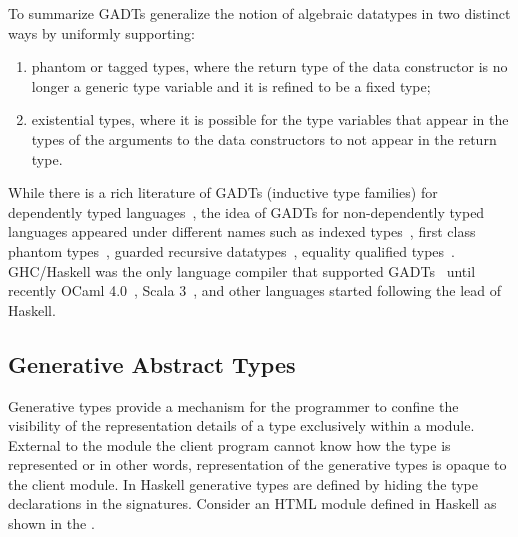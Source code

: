 \documentclass[screen,nonacm,manuscript,review]{acmart} %
\begin{document}
To summarize GADTs generalize the notion of algebraic datatypes in two
distinct ways by uniformly supporting:
\begin{enumerate}
\item phantom or tagged types, where the return type of the data
  constructor is no longer a generic type variable and it is refined
  to be a fixed type;
\item existential types, where it is possible for the type variables
  that appear in the types of the arguments to the data
  constructors to not appear in the return type.
\end{enumerate}

While there is a rich literature of GADTs (inductive type families)
for dependently typed languages~\cite{dybjer_inductive_1991,
  dybjer_inductive_1994}, the idea of GADTs for non-dependently typed
languages appeared under different names such as indexed
types~\cite{zenger_indexed_1997}, first class phantom
types~\cite{cheney_first-class_2003}, guarded recursive
datatypes~\cite{xi_guarded_2003}, equality qualified
types~\cite{sheard_meta-programming_2008}. GHC/Haskell was the only
language compiler that supported GADTs~\cite{peyton_jones_wobbly_2004}
until recently OCaml 4.0~\cite{garrigue_gadt_2011}, Scala 3~\cite{xu_implementing_2021},
and other languages started following the lead of Haskell.


\subsection{Generative Abstract Types}\label{subsubsec:gen-abs-types}
Generative types provide a mechanism for the programmer to confine the
visibility of the representation details of a type
exclusively within a module. External to the module the client program
cannot know how the type is represented or in other words,
representation of the generative types is opaque to the client
module. In Haskell generative types are defined by hiding the type
declarations in the signatures. Consider an HTML module defined in
Haskell as shown in the .
\end{document}
